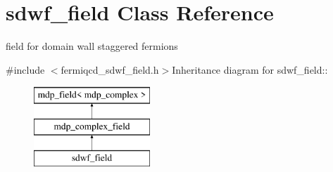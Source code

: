\hypertarget{classsdwf__field}{
\section{sdwf\_\-field Class Reference}
\label{classsdwf__field}
}


field for domain wall staggered fermions  


{\ttfamily \#include $<$fermiqcd\_\-sdwf\_\-field.h$>$}Inheritance diagram for sdwf\_\-field::\begin{figure}[H]
\begin{center}
\leavevmode
\includegraphics[height=3cm]{classsdwf__field}
\end{center}
\end{figure}
